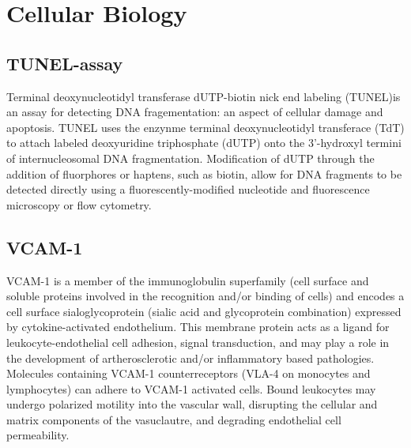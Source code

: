 \cleartooddpage[\thispagestyle{empty}]
\chapter{Cellular Biology}

\section{TUNEL-assay}\label{APPENDIXD_TUNEL}
Terminal deoxynucleotidyl transferase dUTP-biotin nick end labeling (TUNEL)is an assay for detecting DNA fragementation: an aspect of cellular damage and apoptosis. TUNEL uses the enzynme terminal deoxynucleotidyl transferace (TdT) to attach labeled deoxyuridine triphosphate (dUTP) onto the 3'-hydroxyl termini of internucleosomal DNA fragmentation. Modification of dUTP through the addition of fluorphores or haptens, such as biotin, allow for DNA fragments to be detected directly using a fluorescently-modified nucleotide and fluorescence microscopy or flow cytometry.


\section{VCAM-1}\label{APPENDIXD_VCAM1}
VCAM-1 is a member of the immunoglobulin superfamily (cell surface and soluble proteins involved in the recognition and/or binding of cells) and encodes a cell surface sialoglycoprotein (sialic acid and glycoprotein combination) expressed by cytokine-activated endothelium. This membrane protein acts as a ligand for leukocyte-endothelial cell adhesion, signal transduction, and may play a role in the development of artherosclerotic and/or inflammatory based pathologies. Molecules containing VCAM-1 counterreceptors (VLA-4 on monocytes and lymphocytes) can adhere to VCAM-1 activated cells\cite{kaufmann2007}. Bound leukocytes may undergo polarized motility into the vascular wall, disrupting the cellular and matrix components of the vasuclautre, and degrading endothelial cell permeability. 